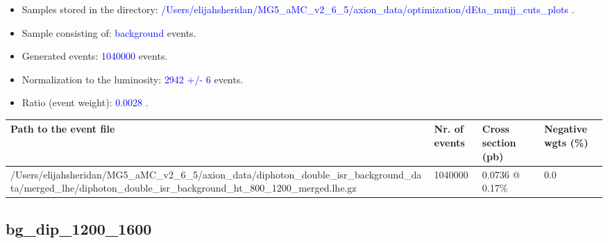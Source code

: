 \documentclass[a4paper, 10pt]{article}
\begin{document}
\begin{itemize}
  \item Samples stored in the directory: \textcolor{blue}{/\-Users/\-elijahsheridan/\-MG5\_aMC\_v2\_6\_5/\-axion\_data/\-optimization/\-dEta\_mmjj\_cuts\_plots} .
   \item Sample consisting of: \textcolor{blue}{background}  events.
   \item Generated events: \textcolor{blue}{1040000 }  events.
   \item Normalization to the luminosity: \textcolor{blue}{2942}\textcolor{blue}{ +/\-- }\textcolor{blue}{6 }  events.
   \item Ratio (event weight): \textcolor{blue}{0.0028 } .  
 
\end{itemize}
\begin{table}[H]
  \begin{center}
    \begin{tabular}{|m{55.0mm}|m{25.0mm}|m{30.0mm}|m{30.0mm}|}
      \hline
      {\cellcolor{yellow}         Path to the event file}& {\cellcolor{yellow}         Nr. of events}& {\cellcolor{yellow}         Cross section (pb)}& {\cellcolor{yellow}         Negative wgts (\%)}\\
      \hline
      {\cellcolor{white}          /\-Users/\-elijahsheridan/\-MG5\_aMC\_v2\_6\_5/\-axion\_data/\-diphoton\_double\_isr\_background\_data/\-merged\_lhe/\-diphoton\_double\_isr\_background\_ht\_800\_1200\_merged.lhe.gz}& {\cellcolor{white}          1040000}& {\cellcolor{white}          0.0736 @ 0.17\%}& {\cellcolor{white}          0.0}\\
\hline
    \end{tabular}
  \end{center}
\end{table}

\subsection{ bg\_dip\_1200\_1600}
\end{document}

